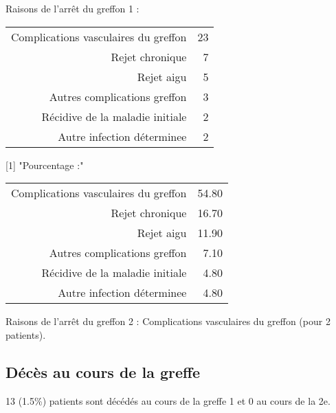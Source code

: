 \documentclass[11pt,a4paper]{article}\usepackage[]{graphicx}\usepackage[]{color}
\begin{document}
Raisons de l'arrêt du greffon 1 :
\begin{table}[H]
\centering
\begin{tabular}{rr}
  \hline
  \hline
Complications vasculaires du greffon &  23 \\ 
  Rejet chronique &   7 \\ 
  Rejet aigu &   5 \\ 
  Autres complications greffon &   3 \\ 
  Récidive de la maladie initiale &   2 \\ 
  Autre infection déterminee &   2 \\ 
   \hline
\end{tabular}
\end{table}
[1] "Pourcentage :"
\begin{table}[H]
\centering
\begin{tabular}{rr}
  \hline
  \hline
Complications vasculaires du greffon & 54.80 \\ 
  Rejet chronique & 16.70 \\ 
  Rejet aigu & 11.90 \\ 
  Autres complications greffon & 7.10 \\ 
  Récidive de la maladie initiale & 4.80 \\ 
  Autre infection déterminee & 4.80 \\ 
   \hline
\end{tabular}
\end{table}


Raisons de l'arrêt du greffon 2 : Complications vasculaires du greffon  (pour 2 patients).

  \subsection{Décès au cours de la greffe}

13 (1.5\%) patients sont décédés au cours de la greffe 1 et 0 au cours de la 2e.
\end{document}
